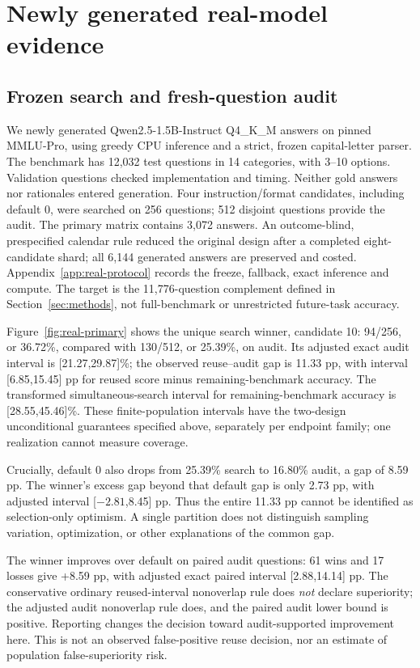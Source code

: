 \section{Newly generated real-model evidence}
\label{sec:real}
\subsection{Frozen search and fresh-question audit}
We newly generated Qwen2.5-1.5B-Instruct Q4\_K\_M answers on pinned MMLU-Pro, using greedy CPU inference and a strict, frozen capital-letter parser. The benchmark has 12,032 test questions in 14 categories, with 3--10 options. Validation questions checked implementation and timing. Neither gold answers nor rationales entered generation. Four instruction/format candidates, including default 0, were searched on 256 questions; 512 disjoint questions provide the audit. The primary matrix contains 3,072 answers. An outcome-blind, prespecified calendar rule reduced the original design after a completed eight-candidate shard; all 6,144 generated answers are preserved and costed. Appendix~\ref{app:real-protocol} records the freeze, fallback, exact inference and compute. The target is the 11,776-question complement defined in Section~\ref{sec:methods}, not full-benchmark or unrestricted future-task accuracy.

Figure~\ref{fig:real-primary} shows the unique search winner, candidate 10: 94/256, or 36.72\%, compared with 130/512, or 25.39\%, on audit. Its adjusted exact audit interval is [21.27,29.87]\%; the observed reuse--audit gap is 11.33 pp, with interval [6.85,15.45] pp for reused score minus remaining-benchmark accuracy. The transformed simultaneous-search interval for remaining-benchmark accuracy is [28.55,45.46]\%. These finite-population intervals have the two-design unconditional guarantees specified above, separately per endpoint family; one realization cannot measure coverage.

Crucially, default 0 also drops from 25.39\% search to 16.80\% audit, a gap of 8.59 pp. The winner's excess gap beyond that default gap is only 2.73 pp, with adjusted interval [$-2.81$,8.45] pp. Thus the entire 11.33 pp cannot be identified as selection-only optimism. A single partition does not distinguish sampling variation, optimization, or other explanations of the common gap.

The winner improves over default on paired audit questions: 61 wins and 17 losses give +8.59 pp, with adjusted exact paired interval [2.88,14.14] pp. The conservative ordinary reused-interval nonoverlap rule does \emph{not} declare superiority; the adjusted audit nonoverlap rule does, and the paired audit lower bound is positive. Reporting changes the decision toward audit-supported improvement here. This is not an observed false-positive reuse decision, nor an estimate of population false-superiority risk.


